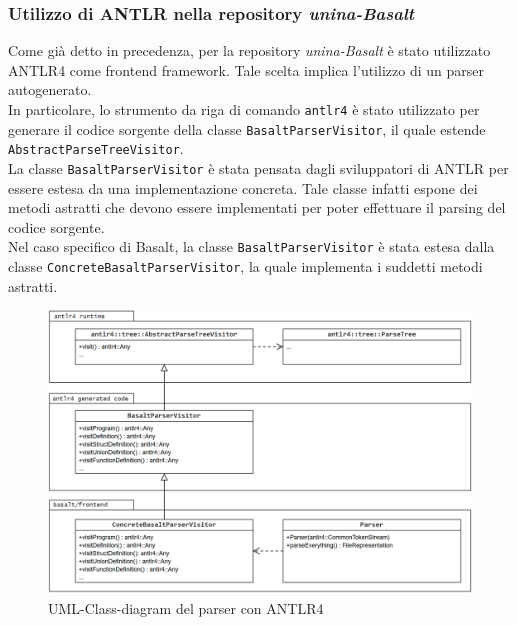 \subsubsection{Utilizzo di ANTLR nella repository \textit{unina-Basalt}}
Come già detto in precedenza, per la repository \textit{unina-Basalt} è stato utilizzato ANTLR4
come frontend framework. Tale scelta implica l'utilizzo di un parser autogenerato. \\

In particolare, lo strumento da riga di comando \texttt{antlr4} è stato utilizzato per generare 
il codice sorgente della classe \texttt{BasaltParserVisitor}, il quale estende 
\texttt{AbstractParseTreeVisitor}. \\

La classe \texttt{BasaltParserVisitor} è stata pensata dagli sviluppatori di 
ANTLR per essere estesa da una implementazione concreta. Tale classe infatti 
espone dei metodi astratti che devono essere implementati per poter
effettuare il parsing del codice sorgente. \\

Nel caso specifico di Basalt, la classe \texttt{BasaltParserVisitor} è stata
estesa dalla classe \texttt{ConcreteBasaltParserVisitor}, la quale implementa i 
suddetti metodi astratti. \\

\begin{figure}[H]
    \centering
        \includegraphics[width=1\textwidth]{../../Assets/ANTLR-PARSER-UML.png} 
    \caption{UML-Class-diagram del parser con ANTLR4}
\end{figure}

\newpage


